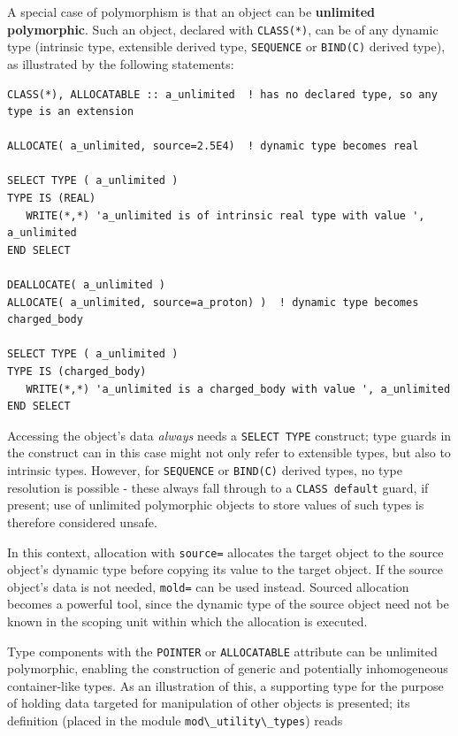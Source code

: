 \documentclass[
  paper=a4,
  ,captions=tableheading
]{scrartcl}
\newcommand{\passthrough}[1]{#1}
\begin{document}
A special case of polymorphism is that an object can be
\textbf{unlimited polymorphic}. Such an object, declared with
\passthrough{\lstinline!CLASS(*)!}, can be of any dynamic type
(intrinsic type, extensible derived type,
\passthrough{\lstinline!SEQUENCE!} or \passthrough{\lstinline!BIND(C)!}
derived type), as illustrated by the following statements:

\begin{lstlisting}
CLASS(*), ALLOCATABLE :: a_unlimited  ! has no declared type, so any type is an extension

ALLOCATE( a_unlimited, source=2.5E4)  ! dynamic type becomes real

SELECT TYPE ( a_unlimited )
TYPE IS (REAL)
   WRITE(*,*) 'a_unlimited is of intrinsic real type with value ', a_unlimited
END SELECT

DEALLOCATE( a_unlimited )
ALLOCATE( a_unlimited, source=a_proton) )  ! dynamic type becomes charged_body

SELECT TYPE ( a_unlimited )
TYPE IS (charged_body)
   WRITE(*,*) 'a_unlimited is a charged_body with value ', a_unlimited
END SELECT
\end{lstlisting}

Accessing the object's data \emph{always} needs a
\passthrough{\lstinline!SELECT TYPE!} construct; type guards in the
construct can in this case might not only refer to extensible types, but
also to intrinsic types. However, for \passthrough{\lstinline!SEQUENCE!}
or \passthrough{\lstinline!BIND(C)!} derived types, no type resolution
is possible - these always fall through to a
\passthrough{\lstinline!CLASS default!} guard, if present; use of
unlimited polymorphic objects to store values of such types is therefore
considered unsafe.

In this context, allocation with \passthrough{\lstinline!source=!}
allocates the target object to the source object's dynamic type before
copying its value to the target object. If the source object's data is
not needed, \passthrough{\lstinline!mold=!} can be used instead. Sourced
allocation becomes a powerful tool, since the dynamic type of the source
object need not be known in the scoping unit within which the allocation
is executed.

Type components with the \passthrough{\lstinline!POINTER!} or
\passthrough{\lstinline!ALLOCATABLE!} attribute can be unlimited
polymorphic, enabling the construction of generic and potentially
inhomogeneous container-like types. As an illustration of this, a
supporting type for the purpose of holding data targeted for
manipulation of other objects is presented; its definition (placed in
the module \passthrough{\lstinline!mod\_utility\_types!}) reads
\end{document}

